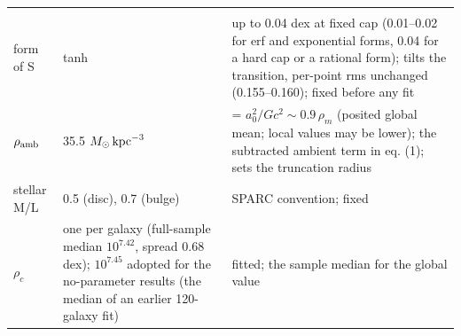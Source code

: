 \documentclass[
  10pt,
]{article}
\begin{document}
\begin{longtable}[]{@{}lll@{}}
\begin{minipage}[t]{0.50\columnwidth}
\end{minipage}\tabularnewline
\begin{minipage}[t]{0.24\columnwidth}\raggedright
form of S\strut
\end{minipage} & \begin{minipage}[t]{0.20\columnwidth}\raggedright
tanh\strut
\end{minipage} & \begin{minipage}[t]{0.50\columnwidth}\raggedright
up to 0.04 dex at fixed cap (0.01--0.02 for erf and exponential forms, 0.04 for a hard cap or a rational form); tilts the transition, per-point rms unchanged (0.155--0.160); fixed before any fit\strut
\end{minipage}\tabularnewline
\begin{minipage}[t]{0.24\columnwidth}\raggedright
$\rho_{\rm amb}$\strut
\end{minipage} & \begin{minipage}[t]{0.20\columnwidth}\raggedright
35.5 $M_\odot\,{\rm kpc}^{-3}$\strut
\end{minipage} & \begin{minipage}[t]{0.50\columnwidth}\raggedright
= $a_0^2/Gc^2\sim 0.9\,\rho_m$ (posited global mean; local values may be lower); the subtracted ambient
term in eq. (1); sets the truncation radius\strut
\end{minipage}\tabularnewline
\begin{minipage}[t]{0.24\columnwidth}\raggedright
stellar M/L\strut
\end{minipage} & \begin{minipage}[t]{0.20\columnwidth}\raggedright
0.5 (disc), 0.7 (bulge)\strut
\end{minipage} & \begin{minipage}[t]{0.50\columnwidth}\raggedright
SPARC convention; fixed\strut
\end{minipage}\tabularnewline
\begin{minipage}[t]{0.24\columnwidth}\raggedright
$\rho_c$\strut
\end{minipage} & \begin{minipage}[t]{0.20\columnwidth}\raggedright
one per galaxy (full-sample median $10^{7.42}$, spread 0.68 dex); $10^{7.45}$ adopted for the no-parameter
results (the median of an earlier 120-galaxy fit)\strut
\end{minipage} & \begin{minipage}[t]{0.50\columnwidth}\raggedright
fitted; the sample median for the global value\strut
\end{minipage}\tabularnewline

\end{longtable}
\end{document}

